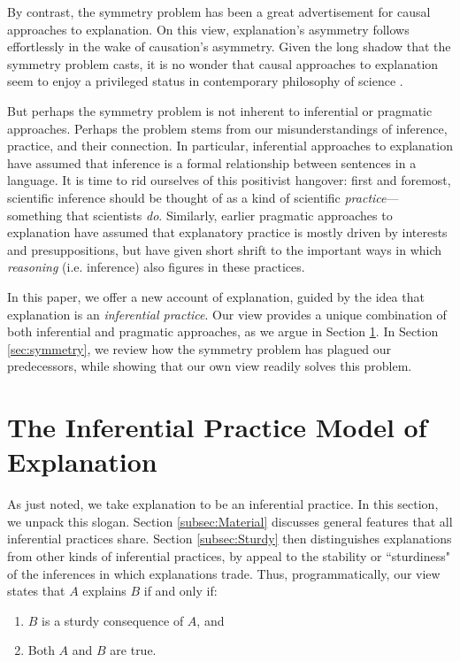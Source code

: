 \documentclass{article}                     %
\begin{document}
By contrast, the symmetry problem has been a great advertisement for causal approaches to explanation. On this view, explanation's asymmetry follows effortlessly in the wake of causation's asymmetry. Given the long shadow that the symmetry problem casts, it is no wonder that causal approaches to explanation seem to enjoy a privileged status in contemporary philosophy of science \citep{Strevens2008,Woodward2003}.

But perhaps the symmetry problem is not inherent to inferential or pragmatic approaches. Perhaps the problem stems from our misunderstandings of inference, practice, and their connection. In particular, inferential approaches to explanation have assumed that inference is a formal relationship between sentences in a language. It is time to rid ourselves of this positivist hangover: first and foremost, scientific inference should be thought of as a kind of scientific \textit{practice}---something that scientists \textit{do}. Similarly, earlier pragmatic approaches to explanation have assumed that explanatory practice is mostly driven by interests and presuppositions, but have given short shrift to the important ways in which \textit{reasoning} (i.e. inference) also figures in these practices.

In this paper, we offer a new account of explanation, guided by the idea that explanation is an \textit{inferential practice}. Our view provides a unique combination of both inferential and pragmatic approaches, as we argue in Section \ref{sec:kernel}. In Section \ref{sec:symmetry}, we review how the symmetry problem has plagued our predecessors, while showing that our own view readily solves this problem.

\section{The Inferential Practice Model of Explanation}
\label{sec:kernel}
As just noted, we take explanation to be an inferential practice. In this section, we unpack this slogan. Section \ref{subsec:Material} discusses general features that all inferential practices share. Section \ref{subsec:Sturdy} then distinguishes explanations from other kinds of inferential practices, by appeal to the stability or ``sturdiness" of the inferences in which explanations trade. Thus, programmatically, our view states that $A$ explains $B$ if and only if:

\begin{enumerate}
\item $B$ is a sturdy consequence of $A$, and 
\item Both $A$ and $B$ are true.
\end{enumerate}
\end{document}
